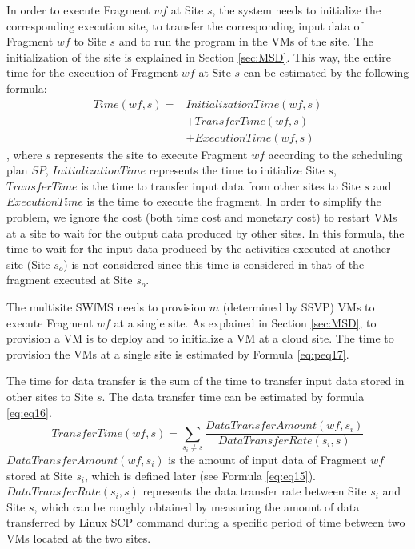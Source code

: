 In order to execute Fragment $wf$ at Site $s$, the system needs to initialize the corresponding execution site, to transfer the corresponding input data of Fragment $wf$ to Site $s$ and  to run the program in the VMs of the site. 
The initialization of the site is explained in Section \ref{sec:MSD}. This way, the entire time for the execution of Fragment $wf$ at Site $s$ can be estimated by the following formula:
\begin{equation}\label{eq:eq7}
\boxed{
\begin{split}
Time(wf, s) = & InitializationTime( wf, s )  \\&+ TransferTime( wf, s ) \\ &  + ExecutionTime( wf,s )
\end{split}
}
\end{equation}
, where $s$ represents the site to execute Fragment $wf$ according to the scheduling plan $SP$, $InitializationTime$ represents the time to initialize Site $s$, $TransferTime$ is the time to transfer input data from other sites to Site $s$ and $ExecutionTime$ is the time to execute the fragment. In order to simplify the problem, we ignore the cost (both time cost and monetary cost) to restart VMs at a site to wait for the output data produced by other sites. In this formula, the time to wait for the input data produced by the activities executed at another site (Site $s_o$) is not considered since this time is considered in that of the fragment executed at Site $s_o$.

The multisite SWfMS needs to provision $m$ (determined by SSVP) VMs to execute Fragment $wf$ at a single site. As explained in Section \ref{sec:MSD}, to provision a VM is to deploy and to initialize a VM at a cloud site.
The time to provision the VMs at a single site is estimated by Formula \ref{eq:peq17}.

The time for data transfer is the sum of the time to transfer input data stored in other sites to Site $s$. The data transfer time can be estimated by formula \ref{eq:eq16}.
\begin{equation}\label{eq:eq16}
\boxed{
TransferTime( wf, s ) = \sum_{s_i\neq s}\frac{DataTransferAmount( wf, s_i )}{DataTransferRate(s_i, s)}
}
\end{equation}
$DataTransferAmount( wf, s_i )$ is the amount of input data of Fragment $wf$ stored at Site $s_i$, which is defined later (see Formula \ref{eq:eq15}). $DataTransferRate(s_i, s)$ represents the data transfer rate between Site $s_i$ and Site $s$, which can be roughly obtained by measuring the amount of data transferred by Linux SCP command during a specific period of time between two VMs located at the two sites.


